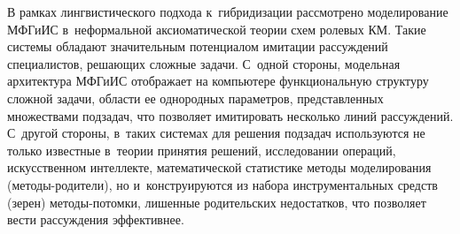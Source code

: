 \begin{multicols}{2}
  В рамках лингвистического подхода к~гибридизации рассмотрено моделирование 
МФГиИС в~неформальной 
аксиоматической теории схем ролевых КМ. Такие системы обладают 
значительным потенциалом имитации рассуждений специалистов, решающих сложные 
задачи. С~одной стороны, модельная архитектура МФГиИС отображает на 
компьютере функциональную структуру сложной задачи, области ее однородных 
параметров, представленных множествами подзадач, что позволяет имитировать несколько 
линий рассуждений. С~другой стороны, в~таких системах для решения подзадач 
используются не только известные в~тео\-рии принятия решений, исследовании операций, 
искусственном интеллекте, математической статистике методы моделирования  
(ме\-то\-ды-ро\-ди\-те\-ли), но и~конструируются из набора инструментальных средств 
(зерен) ме\-то\-ды-по\-том\-ки, лишенные родительских недостатков, что позволяет вести 
рас\-суж\-де\-ния эффективнее. 


  
{\small\frenchspacing
 {%
 \begin{thebibliography}{99}
 


\end{thebibliography}}}
\end{multicols}
